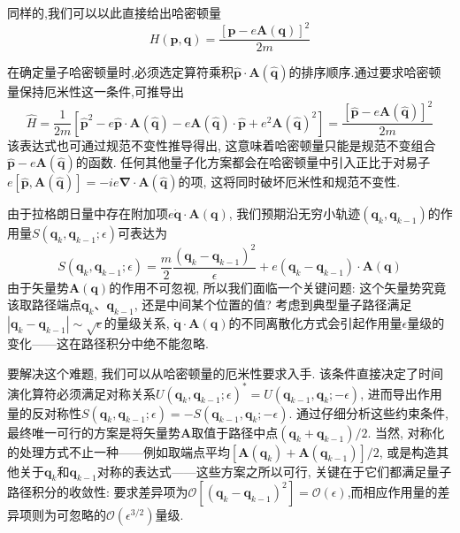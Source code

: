 同样的,我们可以以此直接给出哈密顿量
\begin{equation}
    H(\mathbf{p},\mathbf{q})=\frac{[\mathbf{p}-e\mathbf{A}(\mathbf{q})]^2}{2m}
\end{equation}

在确定量子哈密顿量时,必须选定算符乘积$\hat{\mathbf{p}} \cdot \mathbf{A}(\hat{\mathbf{q}})$的排序顺序.通过要求哈密顿量保持厄米性这一条件,可推导出
\begin{equation}
    \hat{H}=\frac{1}{2m}\left[\hat{\mathbf{p}}^{2}-e\hat{\mathbf{p}}\cdot\mathbf{A}(\hat{\mathbf{q}})-e\mathbf{A}(\hat{\mathbf{q}})\cdot\hat{\mathbf{p}}+e^{2}\mathbf{A}(\hat{\mathbf{q}})^{2}\right]=\frac{[\hat{\mathbf{p}}-e\mathbf{A}(\hat{\mathbf{q}})]^{2}}{2m}
\end{equation}
该表达式也可通过规范不变性推导得出, 这意味着哈密顿量只能是规范不变组合$\hat{\mathbf{p}} - e\mathbf{A}(\hat{\mathbf{q}})$的函数. 任何其他量子化方案都会在哈密顿量中引入正比于对易子$e[\hat{\mathbf{p}}, \mathbf{A}(\hat{\mathbf{q}})] = -ie\boldsymbol{\nabla} \cdot \mathbf{A}(\hat{\mathbf{q}})$的项, 这将同时破坏厄米性和规范不变性.

由于拉格朗日量中存在附加项$e\dot{\mathbf{q}} \cdot \mathbf{A}(\mathbf{q})$, 我们预期沿无穷小轨迹$(\mathbf{q}_k, \mathbf{q}_{k-1})$的作用量$S(\mathbf{q}_k, \mathbf{q}_{k-1}; \epsilon)$可表达为
\begin{equation}\label{56}
    S(\mathbf{q}_k,\mathbf{q}_{k-1};\epsilon)=\frac{m}{2}\frac{(\mathbf{q}_k-\mathbf{q}_{k-1})^2}{\epsilon}+e(\mathbf{q}_k-\mathbf{q}_{k-1})\cdot\mathbf{A}(\mathbf{q})
\end{equation}
由于矢量势$\mathbf{A}(\mathbf{q})$的作用不可忽视, 所以我们面临一个关键问题: 这个矢量势究竟该取路径端点$\mathbf{q}_k$、$\mathbf{q}_{k-1}$, 还是中间某个位置的值? 考虑到典型量子路径满足$|\mathbf{q}_k - \mathbf{q}_{k-1}| \sim \sqrt{\epsilon}$的量级关系, $\dot{\mathbf{q}} \cdot \mathbf{A}(\mathbf{q})$的不同离散化方式会引起作用量$\epsilon$量级的变化——这在路径积分中绝不能忽略.

要解决这个难题, 我们可以从哈密顿量的厄米性要求入手. 该条件直接决定了时间演化算符必须满足对称关系$U(\mathbf{q}_k, \mathbf{q}_{k-1}; \epsilon)^* = U(\mathbf{q}_{k-1}, \mathbf{q}_k; -\epsilon)$, 进而导出作用量的反对称性$S(\mathbf{q}_k, \mathbf{q}_{k-1}; \epsilon) = -S(\mathbf{q}_{k-1}, \mathbf{q}_k; -\epsilon)$. 通过仔细分析这些约束条件, 最终唯一可行的方案是将矢量势$\mathbf{A}$取值于路径中点$(\mathbf{q}_k + \mathbf{q}_{k-1})/2$. 当然, 对称化的处理方式不止一种——例如取端点平均$[\mathbf{A}(\mathbf{q}_k) + \mathbf{A}(\mathbf{q}_{k-1})]/2$, 或是构造其他关于$\mathbf{q}_k$和$\mathbf{q}_{k-1}$对称的表达式——这些方案之所以可行, 关键在于它们都满足量子路径积分的收敛性:
要求差异项为$\mathcal{O}[(\mathbf{q}_k - \mathbf{q}_{k-1})^2] = \mathcal{O}(\epsilon)$,而相应作用量的差异项则为可忽略的$\mathcal{O}(\epsilon^{3/2})$量级.

